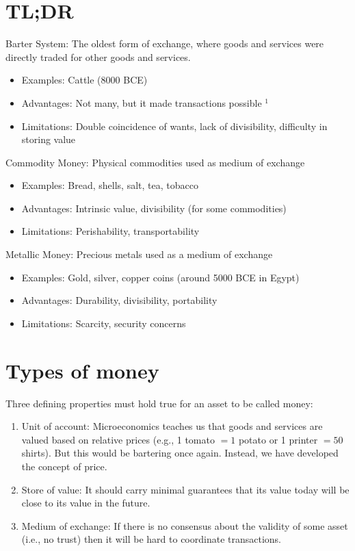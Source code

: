 \documentclass[10pt]{article}
\begin{document}
\section*{TL;DR}
Barter System: The oldest form of exchange, where goods and services were directly traded for other goods and services.

\begin{itemize}
  \item Examples: Cattle (8000 BCE)
  \item Advantages: Not many, but it made transactions possible ${ }^{1}$
  \item Limitations: Double coincidence of wants, lack of divisibility, difficulty in storing value
\end{itemize}

Commodity Money: Physical commodities used as medium of exchange

\begin{itemize}
  \item Examples: Bread, shells, salt, tea, tobacco
  \item Advantages: Intrinsic value, divisibility (for some commodities)
  \item Limitations: Perishability, transportability
\end{itemize}

Metallic Money: Precious metals used as a medium of exchange

\begin{itemize}
  \item Examples: Gold, silver, copper coins (around 5000 BCE in Egypt)
  \item Advantages: Durability, divisibility, portability
  \item Limitations: Scarcity, security concerns
\end{itemize}

\section*{Types of money}
Three defining properties must hold true for an asset to be called money:

\begin{enumerate}
  \item Unit of account: Microeconomics teaches us that goods and services are valued based on relative prices (e.g., 1 tomato $=1$ potato or 1 printer $=50$ shirts). But this would be bartering once again. Instead, we have developed the concept of price.
  \item Store of value: It should carry minimal guarantees that its value today will be close to its value in the future.
  \item Medium of exchange: If there is no consensus about the validity of some asset (i.e., no trust) then it will be hard to coordinate transactions.
\end{enumerate}
\end{document}
